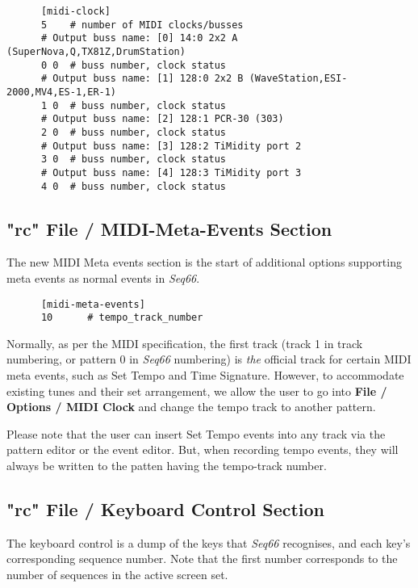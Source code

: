    \begin{verbatim}
      [midi-clock]
      5    # number of MIDI clocks/busses
      # Output buss name: [0] 14:0 2x2 A (SuperNova,Q,TX81Z,DrumStation)
      0 0  # buss number, clock status
      # Output buss name: [1] 128:0 2x2 B (WaveStation,ESI-2000,MV4,ES-1,ER-1)
      1 0  # buss number, clock status
      # Output buss name: [2] 128:1 PCR-30 (303)
      2 0  # buss number, clock status
      # Output buss name: [3] 128:2 TiMidity port 2
      3 0  # buss number, clock status
      # Output buss name: [4] 128:3 TiMidity port 3
      4 0  # buss number, clock status
   \end{verbatim}

\subsection{"rc" File / MIDI-Meta-Events Section}
\label{subsec:rc_file_midi_meta_events}

   The new MIDI Meta events section is the start of additional options
   supporting meta events as normal events in \textsl{Seq66}.

   \begin{verbatim}
      [midi-meta-events]
      10      # tempo_track_number
   \end{verbatim}

   Normally, as per the MIDI specification, the first track (track 1 in track
   numbering, or pattern 0 in \textsl{Seq66} numbering) is \textsl{the}
   official track for certain MIDI meta events, such as Set Tempo and Time
   Signature.  However, to accommodate existing tunes and their set
   arrangement, we allow the user to go into \textbf{File / Options / MIDI
   Clock} and change the tempo track to another pattern.

   Please note that the user can insert Set Tempo events into any track via the
   pattern editor or the event editor.  But, when recording tempo events, they
   will always be written to the patten having the tempo-track number.

\subsection{"rc" File / Keyboard Control Section}
\label{subsec:rc_file_keyboard_control}
        
   The keyboard control is a dump of the keys that \textsl{Seq66}
   recognises, and each key's corresponding sequence number.
   Note that the first number corresponds to the number of sequences in
   the active screen set.

